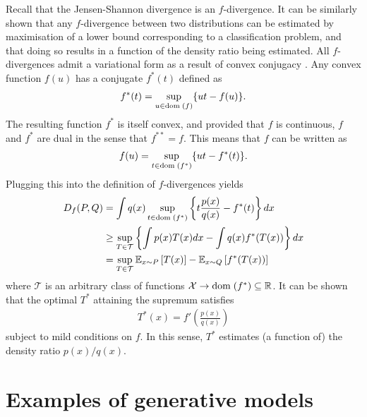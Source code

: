 Recall that the Jensen-Shannon divergence is an $f$-divergence. 
It can be similarly shown that any $f$-divergence between two distributions can be estimated by maximisation of a lower bound corresponding to a classification problem, and that doing so results in a function of the density ratio being estimated.
All $f$-divergences admit a variational form as a result of convex conjugacy \citep{nguyen10ratio}.
Any convex function $f(u)$ has a conjugate $f^*(t)$ defined as
%
\begin{align*}
f^*(t) = \sup_{u \in {\bf{\rm dom}}\;(f)} \{ut - f(u)\}.
\end{align*}
%
The resulting function $f^*$ is itself convex, and
provided that $f$ is continuous, $f$ and $f^*$ are dual in the sense that $f^{**} = f$.
This means that $f$ can be written as
%
\begin{align*}
f(u) = \sup_{t \in {\bf{\rm dom}}\;(f^*)} \{ut - f^*(t)\}.
\end{align*}
%
Plugging this into the definition of $f$-divergences yields
%
\begin{align*}
D_f(P, Q) &= \int q(x) \sup_{t \in {\bf{\rm dom}}\;(f^*)} \left\{t \frac{p(x)}{q(x)} - f^*(t) \right\} dx \\
& \geq \sup_{T \in \mathcal{T}} \left\{ \int p(x) T(x) dx - \int q(x) f^*(T(x)) \right\} dx \\
&= \sup_{T \in \mathcal{T}} \mathbb{E}_{x \sim P} \left[ T(x) \right] - \mathbb{E}_{x \sim Q} \left[ f^*(T(x)) \right] 
\end{align*}
where $\mathcal{T}$ is an arbitrary class of functions $\mathcal{X} \to {\bf{\rm dom}}\;(f^*) \subseteq \mathbb{R}$.
It can be shown \citep{nguyen10ratio} that the optimal $T^*$ attaining the supremum satisfies 
\begin{align*}
T^*(x) = f'\left( \frac{p(x)}{q(x)}\right)
\end{align*}
subject to mild conditions on $f$. 
In this sense, $T^*$ estimates (a function of) the density ratio $p(x)/q(x)$.







\section{Examples of generative models}\label{sec:literature-gen-models}

